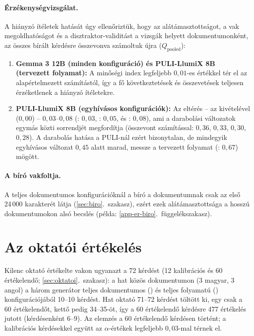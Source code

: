 \paragraph{Érzékenységvizsgálat.} A hiányzó ítéletek hatását úgy ellenőriztük, hogy az alátámasztottságot, a vak
megoldhatóságot és a disztraktor-validitást a vizsgák helyett dokumentumonként, az összes bírált kérdésre
összevonva számoltuk újra ($Q_{\mathrm{pooled}}$):
\begin{enumerate}[label=(\arabic*),leftmargin=*,itemsep=2pt,topsep=2pt]
\item \textbf{Gemma 3 12B (minden konfiguráció) és PULI-LlumiX 8B (tervezett folyamat):} A minőségi index
legfeljebb $0{,}01$-es értékkel tér el az alapértelmezett számítástól, így a fő következtetések és összevetések
teljesen érzéketlenek a hiányzó ítéletekre.
\item \textbf{PULI-LlumiX 8B (egyhívásos konfigurációk):} Az eltérés -- az  kivételével ($0{,}00$) --
$0{,}03$--$0{,}08$ (: $0{,}03$, : $0{,}05$,  és : $0{,}08$), ami a
darabolási változatok egymás közti sorrendjét megfordítja (összevont számítással:  $0{,}36$, 
$0{,}33$,  $0{,}30$,  $0{,}28$). A darabolás hatása a PULI-nál ezért bizonytalan, de mindegyik
egyhívásos változat $0{,}45$ alatt marad, messze a tervezett folyamat (: $0{,}67$) mögött.
\end{enumerate}

\paragraph{A bíró vakfoltja.} A teljes dokumentumos konfigurációknál a bíró a dokumentumnak csak az első
24\,000 karakterét látja (\ref{sec:biro}.~szakasz), ezért ezek alátámasztottsága a hosszú dokumentumokon alsó
becslés (példa: \ref{app-er-biro}.~függelékszakasz).

\section{Az oktatói értékelés}
\label{sec:oktatoi-eredmeny}

Kilenc oktató értékelte vakon ugyanazt a 72 kérdést (12 kalibrációs és 60 értékelendő;
\ref{sec:oktatoi}.~szakasz): a hat közös dokumentumon (3 magyar, 3 angol) a három generátor teljes
dokumentumos () és teljes folyamatú () konfigurációjából 10--10 kérdést. Hat oktató
71--72 kérdést töltött ki, egy csak a 60 értékelendőt, kettő pedig 34--35-öt, így a 60 értékelendő kérdésre
477 értékelés jutott (kérdésenként 6--9). Az elemzés a 60 értékelendő kérdésen történt; a kalibrációs
kérdésekkel együtt az $\alpha$-értékek legfeljebb $0{,}03$-mal térnek el.

